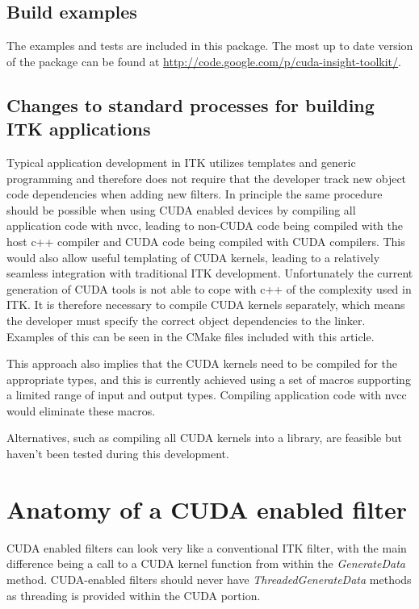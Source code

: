 \documentclass{InsightArticle}
\begin{document}
\subsection{Build examples}
The examples and tests are included in this package. The most up to
date version of the package can be found at \url{http://code.google.com/p/cuda-insight-toolkit/}.

\subsection{Changes to standard processes for building ITK applications}
Typical application development in ITK utilizes templates and generic
programming and therefore does not require that the developer track
new object code dependencies when adding new filters. In principle the
same procedure should be possible when using CUDA enabled devices by
compiling all application code with nvcc, leading to non-CUDA code
being compiled with the host c++ compiler and CUDA code being compiled
with CUDA compilers. This would also allow useful templating of CUDA
kernels, leading to a relatively seamless integration with traditional
ITK development. Unfortunately the current generation of CUDA tools is
not able to cope with c++ of the complexity used in ITK. It is
therefore necessary to compile CUDA kernels separately, which means
the developer must specify the correct object dependencies to the
linker. Examples of this can be seen in the CMake files included with
this article.

This approach also implies that the CUDA kernels need to be compiled
for the appropriate types, and this is currently achieved using a set
of macros supporting a limited range of input and output
types. Compiling application code with nvcc would eliminate these
macros.

Alternatives, such as compiling all CUDA kernels into a library, are
feasible but haven't been tested during this development.



\section{Anatomy of a CUDA enabled filter}
CUDA enabled filters can look very like a conventional ITK filter,
with the main difference being a call to a CUDA kernel function from
within the {\em GenerateData} method. CUDA-enabled filters should
never have {\em ThreadedGenerateData} methods as threading is provided
within the CUDA portion.
\end{document}
